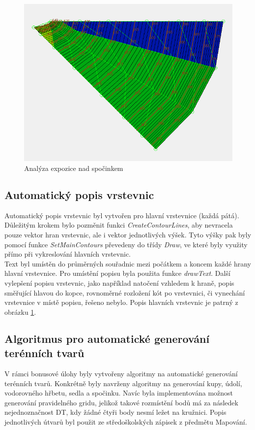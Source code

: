 \documentclass[a4paper,11pt,twoside]{article}
\begin{document}
\vspace{0.2cm}
\begin{figure}[hbt!] 
\begin{center}
\includegraphics[width=15cm]{pictures/gentle_ridge_aspect.PNG} 
\caption[Analýza expozice nad spočinkem]{Analýza expozice nad spočinkem}
\label{fig:gentle_ridge_aspect}
\end{center}
\end{figure}

\subsection{Automatický popis vrstevnic}
Automatický popis vrstevnic byl vytvořen pro hlavní vrstevnice (každá pátá). Důležitým krokem bylo pozměnit funkci \textit{CreateContourLines}, aby nevracela pouze vektor hran vrstevnic, ale i vektor jednotlivých výšek. Tyto výšky pak byly pomocí funkce \textit{SetMainContours} převedeny do třídy \textit{Draw}, ve které byly využity přímo při vykreslování hlavních vrstevnic.\\ \indent Text byl umístěn do průměrných souřadnic mezi počátkem a koncem každé hrany hlavní vrstevnice. Pro umístění popisu byla použita funkce \textit{drawText}. Další vylepšení popisu vrstevnic, jako například natočení vzhledem k hraně, popis směřující hlavou do kopce, rovnoměrné rozložení kót po vrstevnici, či vynechání vrstevnice v místě popisu, řešeno nebylo. Popis hlavních vrstevnic je patrný z obrázku \ref{fig:gentle_ridge_aspect}.

\newpage
\vspace*{-1cm}
\subsection{Algoritmus pro automatické generování terénních tvarů}
V rámci bonusové úlohy byly vytvořeny algoritmy na automatické generování terénních tvarů. Konkrétně byly navrženy algoritmy na generování kupy, údolí, vodorovného hřbetu, sedla a spočinku. Navíc byla implementována možnost generování pravidelného gridu, jelikož takové rozmístění bodů má za následek nejednoznačnost DT, kdy žádné čtyři body nesmí ležet na kružnici. Popis jednotlivých útvarů byl použit ze středoškolských zápisek z předmětu Mapování.
\end{document}

